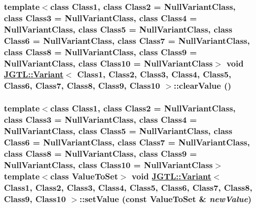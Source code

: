 \hypertarget{class_j_g_t_l_1_1_variant_ea78e1f4b455e101c2ab426ab23a8b15}{
\subsubsection[clearValue]{\setlength{\rightskip}{0pt plus 5cm}template$<$class Class1, class Class2 = Null\-Variant\-Class, class Class3 = Null\-Variant\-Class, class Class4 = Null\-Variant\-Class, class Class5 = Null\-Variant\-Class, class Class6 = Null\-Variant\-Class, class Class7 = Null\-Variant\-Class, class Class8 = Null\-Variant\-Class, class Class9 = Null\-Variant\-Class, class Class10 = Null\-Variant\-Class$>$ void \hyperlink{class_j_g_t_l_1_1_variant}{JGTL::Variant}$<$ Class1, Class2, Class3, Class4, Class5, Class6, Class7, Class8, Class9, Class10 $>$::clear\-Value ()}}
\label{class_j_g_t_l_1_1_variant_ea78e1f4b455e101c2ab426ab23a8b15}


\hypertarget{class_j_g_t_l_1_1_variant_c909cf061197467573f89b74014da76d}{
\subsubsection[setValue]{\setlength{\rightskip}{0pt plus 5cm}template$<$class Class1, class Class2 = Null\-Variant\-Class, class Class3 = Null\-Variant\-Class, class Class4 = Null\-Variant\-Class, class Class5 = Null\-Variant\-Class, class Class6 = Null\-Variant\-Class, class Class7 = Null\-Variant\-Class, class Class8 = Null\-Variant\-Class, class Class9 = Null\-Variant\-Class, class Class10 = Null\-Variant\-Class$>$ template$<$class Value\-To\-Set$>$ void \hyperlink{class_j_g_t_l_1_1_variant}{JGTL::Variant}$<$ Class1, Class2, Class3, Class4, Class5, Class6, Class7, Class8, Class9, Class10 $>$::set\-Value (const Value\-To\-Set \& {\em new\-Value})}}
\label{class_j_g_t_l_1_1_variant_c909cf061197467573f89b74014da76d}




